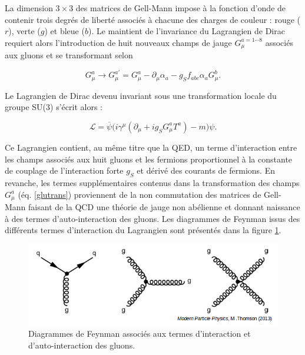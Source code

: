         La dimension $3\times3$ des matrices de Gell-Mann impose à la fonction d'onde de contenir trois degrés de liberté associés à chacune des charges de couleur : rouge ($r$), verte ($g$) et bleue ($b$). Le maintient de l'invariance du Lagrangien de Dirac requiert alors l'introduction de huit nouveaux champs de jauge $G_{\mu}^{a=1\cdots8}$ associés aux gluons et se transformant selon

    \begin{equation}
        G_{\mu}^{a}\rightarrow G_{\mu}^{a'}=G_{\mu}^{a}-\partial_{\mu}\alpha_a-g_Sf_{abc}\alpha_aG_{\mu}^{b}.
    \label{glutrans}
    \end{equation}

    Le Lagrangien de Dirac devenu invariant sous une transformation locale du groupe SU($3$) s'écrit alors :

    \begin{equation}
        \mathcal{L}=\overline{\psi}\bigl(i\gamma^{\mu}(\partial_{\mu}+ig_SG_{\mu}^aT^a)-m\bigr)\psi.
    \end{equation}

    Ce Lagrangien contient, au même titre que la QED, un terme d'interaction entre les champs associés aux huit gluons et les fermions proportionnel à la constante de couplage de l'interaction forte $g_S$ et dérivé des courants de fermions. En revanche, les termes supplémentaires contenus dans la transformation des champs $G_{\mu}^a$ (éq. \ref{glutrans}) proviennent de la non commutation des matrices de Gell-Mann faisant de la QCD une théorie de jauge non abélienne et donnant naissance à des termes d'auto-interaction des gluons. Les diagrammes de Feynman issus des différents termes d'interaction du Lagrangien sont présentés dans la figure \ref{QCDdiag}. \\

    \begin{figure}
    \centering
        \includegraphics[scale=0.5]{Chapitre2/Images/QCDdiag.png} 
        \caption{Diagrammes de Feynman associés aux termes d'interaction et d'auto-interaction des gluons.}
    \label{QCDdiag}
    \end{figure}

